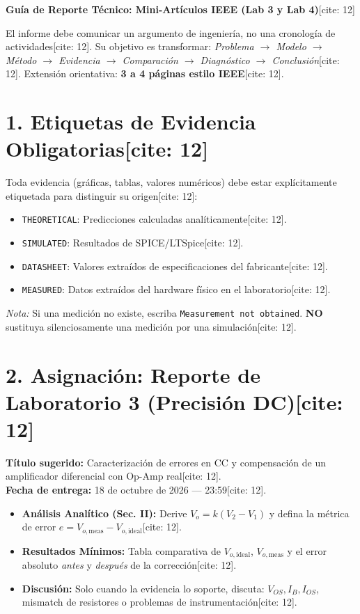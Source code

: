 \documentclass[11pt, a4paper]{article}
\begin{document}
\begin{center}
    \Large\textbf{\textcolor{ucbblue}{Guía de Reporte Técnico: Mini-Artículos IEEE (Lab 3 y Lab 4)}}[cite: 12]
\end{center}

\begin{tcolorbox}[colback=ucbblue!5, colframe=ucbblue, title=\textbf{Propósito del Informe[cite: 12]}]
    El informe debe comunicar un argumento de ingeniería, no una cronología de actividades[cite: 12]. Su objetivo es transformar: \textit{Problema $\rightarrow$ Modelo $\rightarrow$ Método $\rightarrow$ Evidencia $\rightarrow$ Comparación $\rightarrow$ Diagnóstico $\rightarrow$ Conclusión}[cite: 12]. Extensión orientativa: \textbf{3 a 4 páginas estilo IEEE}[cite: 12].
\end{tcolorbox}

\section*{1. Etiquetas de Evidencia Obligatorias[cite: 12]}
Toda evidencia (gráficas, tablas, valores numéricos) debe estar explícitamente etiquetada para distinguir su origen[cite: 12]:
\begin{itemize}
    \item \texttt{THEORETICAL}: Predicciones calculadas analíticamente[cite: 12].
    \item \texttt{SIMULATED}: Resultados de SPICE/LTSpice[cite: 12].
    \item \texttt{DATASHEET}: Valores extraídos de especificaciones del fabricante[cite: 12].
    \item \texttt{MEASURED}: Datos extraídos del hardware físico en el laboratorio[cite: 12].
\end{itemize}
\textit{Nota:} Si una medición no existe, escriba \texttt{Measurement not obtained}. \textbf{NO} sustituya silenciosamente una medición por una simulación[cite: 12].

\section*{2. Asignación: Reporte de Laboratorio 3 (Precisión DC)[cite: 12]}
\textbf{Título sugerido:} Caracterización de errores en CC y compensación de un amplificador diferencial con Op-Amp real[cite: 12]. \\
\textbf{Fecha de entrega:} 18 de octubre de 2026 — 23:59[cite: 12].
\begin{itemize}
    \item \textbf{Análisis Analítico (Sec. II):} Derive $V_o = k(V_2 - V_1)$ y defina la métrica de error $e = V_{o,\mathrm{meas}} - V_{o,\mathrm{ideal}}$[cite: 12].
    \item \textbf{Resultados Mínimos:} Tabla comparativa de $V_{o,\mathrm{ideal}}$, $V_{o,\mathrm{meas}}$ y el error absoluto \textit{antes} y \textit{después} de la corrección[cite: 12].
    \item \textbf{Discusión:} Solo cuando la evidencia lo soporte, discuta: $V_{OS}, I_B, I_{OS}$, mismatch de resistores o problemas de instrumentación[cite: 12].
\end{itemize}
\end{document}
